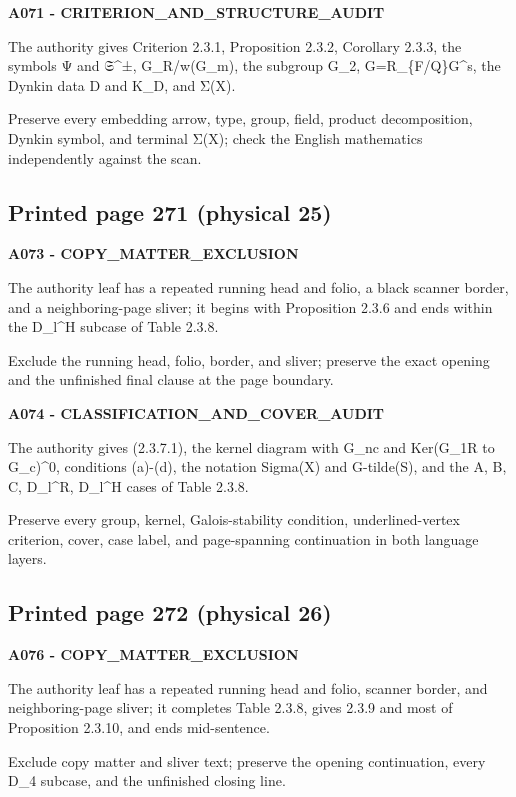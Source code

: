 \documentclass[10pt,a4paper]{article}
\begin{document}
\textbf{A071 - CRITERION\_AND\_STRUCTURE\_AUDIT}

The authority gives Criterion 2.3.1, Proposition 2.3.2, Corollary 2.3.3, the symbols Ψ and 𝔖\^{}±, G\_R/w(G\_m), the subgroup G\_2, G=R\_\{F/Q\}G\^{}s, the Dynkin data D and K\_D, and Σ(X).

Preserve every embedding arrow, type, group, field, product decomposition, Dynkin symbol, and terminal Σ(X); check the English mathematics independently against the scan.

\subsection{Printed page 271 (physical 25)}

\textbf{A073 - COPY\_MATTER\_EXCLUSION}

The authority leaf has a repeated running head and folio, a black scanner border, and a neighboring-page sliver; it begins with Proposition 2.3.6 and ends within the D\_l\^{}H subcase of Table 2.3.8.

Exclude the running head, folio, border, and sliver; preserve the exact opening and the unfinished final clause at the page boundary.

\textbf{A074 - CLASSIFICATION\_AND\_COVER\_AUDIT}

The authority gives (2.3.7.1), the kernel diagram with G\_nc and Ker(G\_1R to G\_c)\^{}0, conditions (a)-(d), the notation Sigma(X) and G-tilde(S), and the A, B, C, D\_l\^{}R, D\_l\^{}H cases of Table 2.3.8.

Preserve every group, kernel, Galois-stability condition, underlined-vertex criterion, cover, case label, and page-spanning continuation in both language layers.

\subsection{Printed page 272 (physical 26)}

\textbf{A076 - COPY\_MATTER\_EXCLUSION}

The authority leaf has a repeated running head and folio, scanner border, and neighboring-page sliver; it completes Table 2.3.8, gives 2.3.9 and most of Proposition 2.3.10, and ends mid-sentence.

Exclude copy matter and sliver text; preserve the opening continuation, every D\_4 subcase, and the unfinished closing line.
\end{document}
